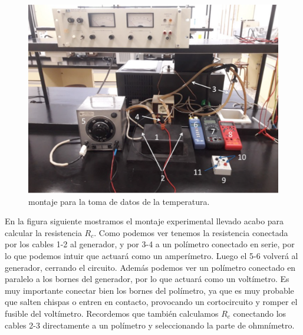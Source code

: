\documentclass[12pt,a4paper]{article}
\begin{document}
\newpage

\begin{figure}[h!] \centering
\includegraphics[scale=0.58]{foto1.png}
\caption{montaje para la toma de datos de la temperatura.}
\label{Fig:foto1}
\end{figure}


\newpage

En la figura siguiente mostramos el montaje experimental llevado acabo para calcular la resistencia $R_c$. Como podemos ver tenemos la resistencia conectada por los cables 1-2 al generador, y por 3-4 a un polímetro conectado en serie, por lo que podemos intuir que actuará como un amperímetro. Luego el 5-6 volverá al generador, cerrando el circuito. Además podemos ver un polímetro conectado en paralelo a los bornes del generador, por lo que actuará como un voltímetro. Es muy importante conectar bien los bornes del polímetro, ya que es muy probable que salten chispas o entren en contacto, provocando un cortocircuito y romper el fusible del voltímetro. Recordemos que también calculamos $R_c$ conectando los cables 2-3 directamente a un polímetro y seleccionando la parte de ohmnímetro.
\end{document}
